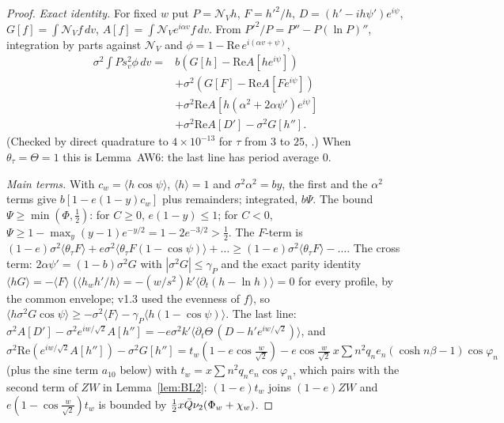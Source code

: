 \begin{proof}
\emph{Exact identity.} For fixed $w$ put $P=\mathcal N_Vh$, $F=h'^2/h$, $D=(h'-ih\psi')e^{i\psi}$, $G[f]=\int\mathcal N_Vf\,dv$, $A[f]=\int\mathcal N_Ve^{i\alpha v}f\,dv$.
From $P'^2/P=P''-P(\ln P)''$, integration by parts against $\mathcal N_V$ and $\phi=1-\mathrm{Re}\,e^{i(\alpha v+\psi)}$,
\begin{equation}
\begin{aligned}
\sigma^2\!\!\int\!Ps_v^2\phi\,dv={}&b(G[h]-\mathrm{Re}A[he^{i\psi}])\\&+\sigma^2(G[F]-\mathrm{Re}A[Fe^{i\psi}])\\
&+\sigma^2\mathrm{Re}A[h(\alpha^2+2\alpha\psi')e^{i\psi}]\\&+\sigma^2\mathrm{Re}A[D']-\sigma^2G[h''].
\end{aligned}
\label{eq:BLid}
\end{equation}
(Checked by direct quadrature to $4\times10^{-13}$ for $\tau$ from $3$ to $25$, .) When $\theta_\tau=\Theta=1$ this is Lemma~AW6: the
last line has period average $0$.

\emph{Main terms.} With $c_w=\langle h\cos\psi\rangle$, $\langle h\rangle=1$ and $\sigma^2\alpha^2=by$, the first and the $\alpha^2$ terms give
$b[1-e(1-y)c_w]$ plus remainders; integrated, $b\Psi$. The bound $\Psi\ge\min(\Phi,\frac12)$: for $C\ge0$, $e(1-y)\le1$; for $C<0$,
$\Psi\ge1-\max_y(y-1)e^{-y/2}=1-2e^{-3/2}>\tfrac12$. The $F$-term is $(1-e)\sigma^2\langle\theta_\tau F\rangle+e\sigma^2\langle\theta_\tau F(1-\cos\psi)\rangle+\dots\ge(1-e)\sigma^2\langle\theta_\tau F\rangle-\dots$.
The cross term: $2\alpha\psi'=(1-b)\sigma^2G$ with $|\sigma^2G|\le\gamma_P$ and the exact parity identity $\langle hG\rangle=-\langle F\rangle$
($\langle h_wh'/h\rangle=-(w/s^2)k'\langle\partial_t(h-\ln h)\rangle=0$ for every profile, by the common envelope; v1.3 used the evenness of $f$), so $\langle h\sigma^2G\cos\psi\rangle\ge-\sigma^2\langle F\rangle-\gamma_P\langle h(1-\cos\psi)\rangle$.
The last line: $\sigma^2A[D']-\sigma^2e^{iw/\sqrt2}A[h'']=-e\sigma^2k'\langle\partial_t\Theta\,(D-h'e^{iw/\sqrt2})\rangle$, and
$\sigma^2\mathrm{Re}(e^{iw/\sqrt2}A[h''])-\sigma^2G[h'']=t_w(1-e\cos\tfrac{w}{\sqrt2})-e\cos\tfrac{w}{\sqrt2}\,x\sum n^2q_ne_n(\cosh n\beta-1)\cos\varphi_n$ (plus the sine term $a_{10}$ below) with
$t_w=x\sum n^2q_ne_n\cos\varphi_n$, which pairs with the second term of $ZW$ in Lemma~\ref{lem:BL2}: $(1-e)t_w$ joins $(1-e)ZW$ and
$e(1-\cos\frac w{\sqrt2})t_w$ is bounded by $\frac12x\bar Q\nu_2(\Phi_w+\chi_w)$.


\end{proof}

